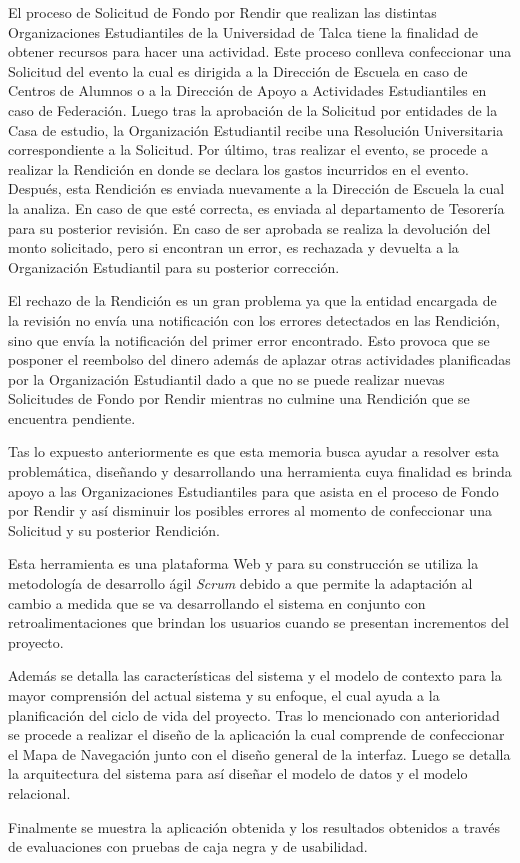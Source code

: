 \begin{resumen}
    El proceso de Solicitud de Fondo por Rendir que realizan las distintas Organizaciones Estudiantiles de la Universidad de Talca tiene la finalidad de obtener recursos para hacer una actividad. Este proceso conlleva confeccionar una Solicitud del evento la cual es dirigida a la Dirección de Escuela en caso de Centros de Alumnos o a la Dirección de Apoyo a Actividades Estudiantiles en caso de Federación. Luego tras la aprobación de la Solicitud por entidades de la Casa de estudio, la Organización Estudiantil recibe una Resolución Universitaria correspondiente a la Solicitud. Por último, tras realizar el evento, se procede a realizar la Rendición en donde se declara los gastos incurridos en el evento. Después, esta Rendición es enviada nuevamente a la Dirección de Escuela la cual la analiza. En caso de que esté correcta, es enviada al departamento de Tesorería para su posterior revisión. En caso de ser aprobada se realiza la devolución del monto solicitado, pero si encontran un error, es rechazada y devuelta a la Organización Estudiantil para su posterior corrección.

El rechazo de la Rendición es un gran problema ya que la entidad encargada de la revisión no envía una notificación con los errores detectados en las Rendición, sino que envía la notificación del primer error encontrado. Esto provoca que se posponer el reembolso del dinero además de aplazar otras actividades planificadas por la Organización Estudiantil dado a que no se puede realizar nuevas Solicitudes de Fondo por Rendir mientras no culmine una Rendición que se encuentra pendiente.

Tas lo expuesto anteriormente es que esta memoria busca ayudar a resolver esta problemática, diseñando y desarrollando una herramienta cuya finalidad es brinda apoyo a las Organizaciones Estudiantiles para que asista en el proceso de Fondo por Rendir y así disminuir los posibles errores al momento de confeccionar una Solicitud y su posterior Rendición.

Esta herramienta es una plataforma Web y para su construcción se utiliza la metodología de desarrollo ágil \emph{Scrum} debido a que permite la adaptación al cambio a medida que se va desarrollando el sistema en conjunto con retroalimentaciones que brindan los usuarios cuando se presentan incrementos del proyecto.

Además se detalla las características del sistema y el modelo de contexto para la mayor comprensión del actual sistema y su enfoque, el cual ayuda a la planificación del ciclo de vida del proyecto. Tras lo mencionado con anterioridad se procede a realizar el diseño de la aplicación la cual comprende de confeccionar el Mapa de Navegación junto con el diseño general de la interfaz. Luego se detalla la arquitectura del sistema para así diseñar el modelo de datos y el modelo relacional.

Finalmente se muestra la aplicación obtenida y los resultados obtenidos a través de evaluaciones con pruebas de caja negra y de usabilidad.

\end{resumen}